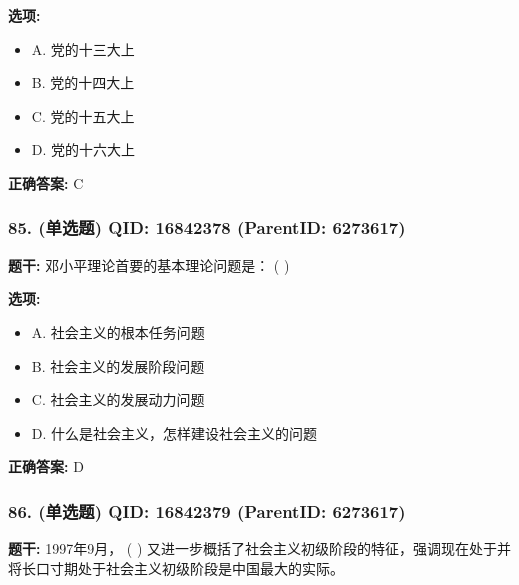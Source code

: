 \documentclass[12pt,UTF8]{ctexart}
\begin{document}
\textbf{选项:}
\begin{itemize}[leftmargin=*]

  \item A. 党的十三大上

  \item B. 党的十四大上

  \item C. 党的十五大上

  \item D. 党的十六大上

\end{itemize}

\textbf{正确答案:}
C

\vspace{0.3em}\hrulefill\vspace{0.7em}

\subsubsection*{85. (单选题) \small QID: 16842378 (ParentID: 6273617)}

\textbf{题干:}
邓小平理论首要的基本理论问题是： ( )



\textbf{选项:}
\begin{itemize}[leftmargin=*]

  \item A. 社会主义的根本任务问题

  \item B. 社会主义的发展阶段问题

  \item C. 社会主义的发展动力问题

  \item D. 什么是社会主义，怎样建设社会主义的问题

\end{itemize}

\textbf{正确答案:}
D

\vspace{0.3em}\hrulefill\vspace{0.7em}

\subsubsection*{86. (单选题) \small QID: 16842379 (ParentID: 6273617)}

\textbf{题干:}
1997年9月， ( ) 又进一步概括了社会主义初级阶段的特征，强调现在处于并将长口寸期处于社会主义初级阶段是中国最大的实际。
\end{document}
